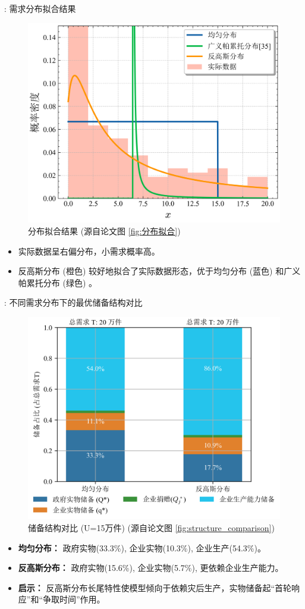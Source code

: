 \documentclass[9pt]{beamer}
\begin{document}
\begin{frame}{\insertsectionhead: 需求分布拟合结果}
    \begin{figure}
        \centering
        \includegraphics[width=0.7\linewidth]{basic_pictures/分布拟合.png}
        \caption{分布拟合结果 (源自论文图 \ref{fig:分布拟合})}
        \label{fig:beamer_dist_fit}
    \end{figure}
    \begin{itemize}
        \item 实际数据呈右偏分布，小需求概率高。
        \item 反高斯分布 (橙色) 较好地拟合了实际数据形态，优于均匀分布 (蓝色) 和广义帕累托分布 (绿色) \cite{Li2022Stackelberg}。
    \end{itemize}
\end{frame}

\begin{frame}{\insertsectionhead: 不同需求分布下的最优储备结构对比}
    \begin{figure}
        \centering
        \includegraphics[width=0.7\linewidth]{basic_pictures/储备结构对比.png}
        \caption{储备结构对比 (U=15万件) (源自论文图 \ref{fig:structure_comparison})}
        \label{fig:beamer_structure_comparison}
    \end{figure}
    \begin{itemize}
        \item \textbf{均匀分布：} 政府实物(33.3\%), 企业实物(10.3\%), 企业生产(54.3\%)。
        \item \textbf{反高斯分布：} 政府实物(15.6\%), 企业实物(5.7\%), 更依赖企业生产能力。
        \item \textbf{启示：} 反高斯分布长尾特性使模型倾向于依赖灾后生产，实物储备起“首轮响应”和“争取时间”作用。
    \end{itemize}
\end{frame}
\end{document}
